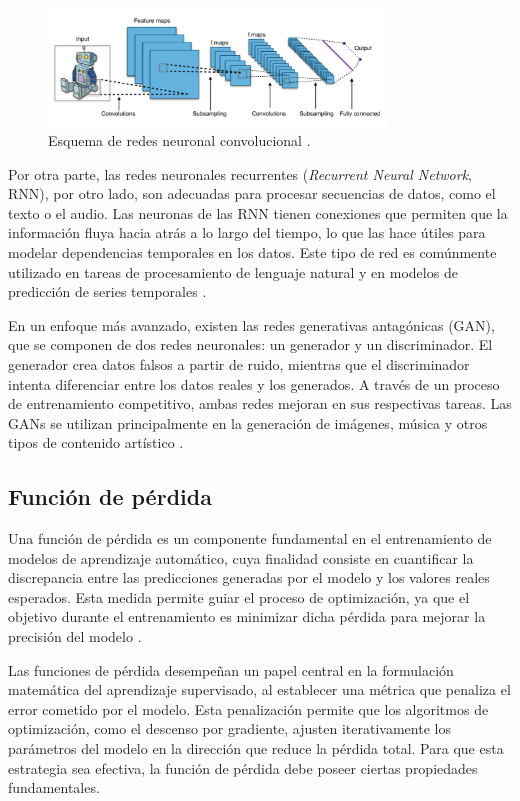 \begin{figure}[H]
    \centering
    \includegraphics[width=0.8\textwidth]{./img/modelo/CNN.png}
    \caption{Esquema de redes neuronal convolucional \cite{uniteai2020cnn}.}
    \label{fig:esq-CNN}
\end{figure}


Por otra parte, las redes neuronales recurrentes (\textit{Recurrent Neural Network}, RNN), por otro lado, son adecuadas para procesar secuencias de datos, como el texto o el audio. Las neuronas de las RNN tienen conexiones que permiten que la información fluya hacia atrás a lo largo del tiempo, lo que las hace útiles para modelar dependencias temporales en los datos. Este tipo de red es comúnmente utilizado en tareas de procesamiento de lenguaje natural y en modelos de predicción de series temporales \cite{haykin2009neural}.

En un enfoque más avanzado, existen las redes generativas antagónicas (GAN), que se componen de dos redes neuronales: un generador y un discriminador. El generador crea datos falsos a partir de ruido, mientras que el discriminador intenta diferenciar entre los datos reales y los generados. A través de un proceso de entrenamiento competitivo, ambas redes mejoran en sus respectivas tareas. Las GANs se utilizan principalmente en la generación de imágenes, música y otros tipos de contenido artístico \cite{nielsen2015neural}.

\subsection{Función de pérdida}
Una función de pérdida es un componente fundamental en el entrenamiento de modelos de aprendizaje automático, cuya finalidad consiste en cuantificar la discrepancia entre las predicciones generadas por el modelo y los valores reales esperados. Esta medida permite guiar el proceso de optimización, ya que el objetivo durante el entrenamiento es minimizar dicha pérdida para mejorar la precisión del modelo \cite{eitca_loss_function}.

Las funciones de pérdida desempeñan un papel central en la formulación matemática del aprendizaje supervisado, al establecer una métrica que penaliza el error cometido por el modelo. Esta penalización permite que los algoritmos de optimización, como el descenso por gradiente, ajusten iterativamente los parámetros del modelo en la dirección que reduce la pérdida total. Para que esta estrategia sea efectiva, la función de pérdida debe poseer ciertas propiedades fundamentales.

